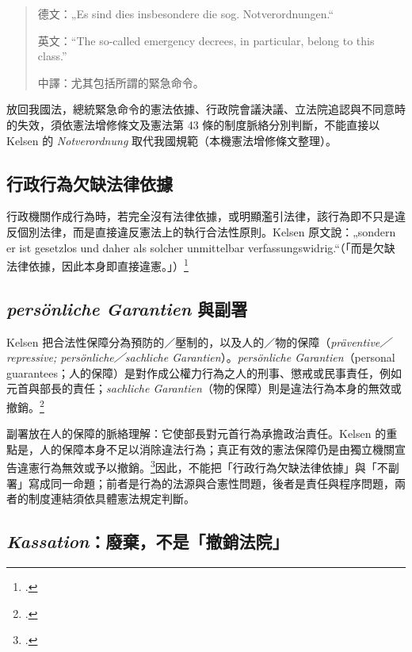 \begin{quote}
德文：„Es sind dies insbesondere die sog. Notverordnungen.``

英文：``The so-called emergency decrees, in particular, belong to this class.''

中譯：尤其包括所謂的緊急命令。
\end{quote}

放回我國法，總統緊急命令的憲法依據、行政院會議決議、立法院追認與不同意時的失效，須依憲法增修條文及憲法第 43 條的制度脈絡分別判斷，不能直接以 Kelsen 的 \emph{Notverordnung} 取代我國規範（本機憲法增修條文整理）。

\subsection{行政行為欠缺法律依據}

行政機關作成行為時，若完全沒有法律依據，或明顯濫引法律，該行為即不只是違反個別法律，而是直接違反憲法上的執行合法性原則。Kelsen 原文說：„sondern er ist gesetzlos und daher als solcher unmittelbar verfassungswidrig.``（「而是欠缺法律依據，因此本身即直接違憲。」）\footcites[41]{kelsen1929}[33]{kelsen2015}

\subsection{\texorpdfstring{\emph{persönliche Garantien} 與副署}{persönliche Garantien 與副署}}

Kelsen 把合法性保障分為預防的／壓制的，以及人的／物的保障（\emph{präventive／repressive; persönliche／sachliche Garantien}）。\emph{persönliche Garantien}（personal guarantees；人的保障）是對作成公權力行為之人的刑事、懲戒或民事責任，例如元首與部長的責任；\emph{sachliche Garantien}（物的保障）則是違法行為本身的無效或撤銷。\footcites[35--36, 43--44]{kelsen2015}[43--44, 51--52]{kelsen1929}

副署放在人的保障的脈絡理解：它使部長對元首行為承擔政治責任。Kelsen 的重點是，人的保障本身不足以消除違法行為；真正有效的憲法保障仍是由獨立機關宣告違憲行為無效或予以撤銷。\footcites[43--44]{kelsen2015}[51--52]{kelsen1929}因此，不能把「行政行為欠缺法律依據」與「不副署」寫成同一命題；前者是行為的法源與合憲性問題，後者是責任與程序問題，兩者的制度連結須依具體憲法規定判斷。

\subsection{\texorpdfstring{\emph{Kassation}：廢棄，不是「撤銷法院」}{Kassation：廢棄，不是「撤銷法院」}}

